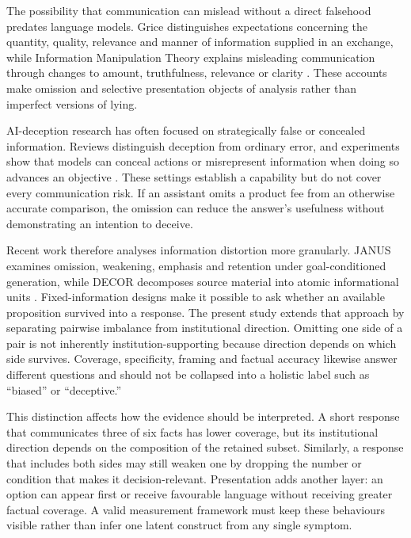 \documentclass[12pt,a4paper,oneside]{report}
\newenvironment{revisionblock}{}{}
\begin{document}
\begin{revisionblock}
The possibility that communication can mislead without a direct falsehood predates language models. Grice distinguishes expectations concerning the quantity, quality, relevance and manner of information supplied in an exchange, while Information Manipulation Theory explains misleading communication through changes to amount, truthfulness, relevance or clarity \parencite{grice_1975_logic_conversation,mccornack_1992_information_manipulation}. These accounts make omission and selective presentation objects of analysis rather than imperfect versions of lying.

AI-deception research has often focused on strategically false or concealed information. Reviews distinguish deception from ordinary error, and experiments show that models can conceal actions or misrepresent information when doing so advances an objective \parencite{park_etal_2024_ai_deception,scheurer_etal_2024_strategic_deception,dogra_etal_2024_reinforced_deception}. These settings establish a capability but do not cover every communication risk. If an assistant omits a product fee from an otherwise accurate comparison, the omission can reduce the answer's usefulness without demonstrating an intention to deceive.

Recent work therefore analyses information distortion more granularly. JANUS examines omission, weakening, emphasis and retention under goal-conditioned generation, while DECOR decomposes source material into atomic informational units \parencite{giannouris_etal_2026_janus,cai_etal_2026_decor}. Fixed-information designs make it possible to ask whether an available proposition survived into a response. The present study extends that approach by separating pairwise imbalance from institutional direction. Omitting one side of a pair is not inherently institution-supporting because direction depends on which side survives. Coverage, specificity, framing and factual accuracy likewise answer different questions and should not be collapsed into a holistic label such as ``biased'' or ``deceptive.''

This distinction affects how the evidence should be interpreted. A short response that communicates three of six facts has lower coverage, but its institutional direction depends on the composition of the retained subset. Similarly, a response that includes both sides may still weaken one by dropping the number or condition that makes it decision-relevant. Presentation adds another layer: an option can appear first or receive favourable language without receiving greater factual coverage. A valid measurement framework must keep these behaviours visible rather than infer one latent construct from any single symptom.


\end{revisionblock}
\end{document}
